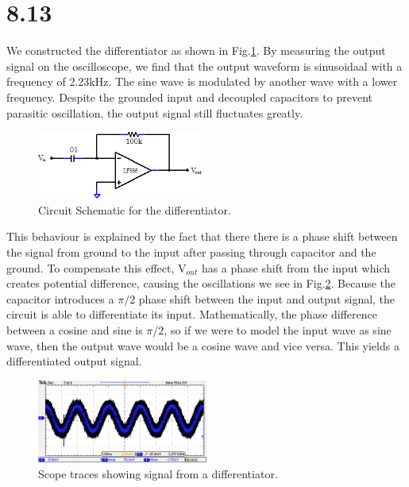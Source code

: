\documentclass[authoryear, 12pt,5p, times]{elsarticle}
\begin{document}
 \section*{8.13}
 We constructed the differentiator as shown in Fig.\ref{8_13_schema}. By measuring the output signal on the oscilloscope, we find that the output waveform is sinusoidaal with a frequency of 2.23kHz. The sine wave is modulated by another wave with a lower frequency. Despite the grounded input and decoupled capacitors to prevent parasitic oscillation, the output signal still fluctuates greatly. 
 \begin{figure}[h!]
 \centering
  \includegraphics[width=0.5\textwidth]{figure/8_13_schema.png} 
\caption{Circuit Schematic for the differentiator.}
\label{8_13_schema}
 \end{figure}
\par This behaviour is explained by the fact that there there is a phase shift between the signal from ground to the input after passing through capacitor and the ground. To compensate this effect, V$_{out}$ has a phase shift from the input which creates potential difference, causing the oscillations we see in Fig.\ref{8_13_scope}. Because the capacitor introduces a $\pi/2$ phase shift between the input and output signal, the circuit is able to differentiate its input. Mathematically, the phase difference between a cosine and sine is $\pi/2$, so if we were to model the input wave as sine wave, then the output wave would be a cosine wave and vice versa. This yields a differentiated output signal. 
 \begin{figure}[h!]
 \centering
  \includegraphics[width=0.5\textwidth]{figure/8_13_scope.png} 
\caption{Scope traces showing signal from a differentiator.}
\label{8_13_scope}
 \end{figure}
\end{document}
